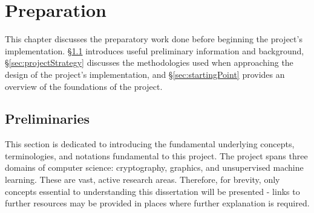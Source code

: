 \chapter{Preparation}
\label{chap:preparation}

\indent \indent
This chapter discusses the preparatory work done before beginning the project's implementation. §\ref{sec:preliminaries} introduces useful preliminary information and background, §\ref{sec:projectStrategy} discusses the methodologies used when approaching the design of the project's implementation, and §\ref{sec:startingPoint} provides an overview of the foundations of the project.

\section{Preliminaries}
\label{sec:preliminaries}
\setlength{\leftskip}{0.25cm}
\indent \indent
This section is dedicated to introducing the fundamental underlying concepts, terminologies, and notations fundamental to this project. The project spans three domains of computer science: cryptography, graphics, and unsupervised machine learning. These are vast, active research areas. Therefore, for brevity, only concepts essential to understanding this dissertation will be presented - links to further resources may be provided in places where further explanation is required.

\setlength{\leftskip}{0cm}

